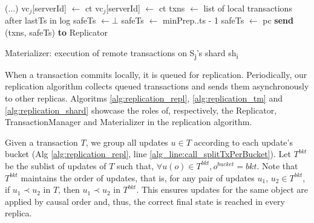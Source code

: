 \documentclass[sigplan,10pt]{acmart}
\begin{document}
\begin{algorithm}
	\small{
	\begin{algorithmic}[1]
		\Statex \hspace*{1.4em} (...)	
		\State vc$_j$[serverId] $\leftarrow$ ct
		\EndFunction
		\State vc$_j$[serverId] $\leftarrow$ ct
		\EndFunction
			\State txns $\leftarrow$ list of local transactions after lastTs in log
			\State safeTs $\leftarrow \bot$
				\State safeTs $\leftarrow $ minPrep..ts - 1 %
			\Else
				\State safeTs $\leftarrow$ pc
			\EndIf
			\State \textbf{send} (txns, safeTs) \textbf{to} Replicator
		\EndFunction
	\end{algorithmic}
}
	\caption{Materializer: execution of remote transactions on S\textsubscript{j}'s shard sh\textsubscript{i}}
	\label{alg:replication_shard}
\end{algorithm}

When a transaction commits locally, it is queued for replication.
Periodically, our replication algorithm collects queued transactions and sends them asynchronously to other replicas.
Algoritms \ref{alg:replication_repl}, \ref{alg:replication_tm} and \ref{alg:replication_shard} showcase the roles of, respectively, the Replicator, TransactionManager and Materializer in the replication algorithm.


Given a transaction $T$, we group all updates $u \in T$ according to each update's bucket (Alg \ref{alg:replication_repl}, line \ref{alg_line:call_splitTxPerBucket}).
Let $T^{bkt}$ be the sublist of updates of $T$ such that, $\forall u(o) \in T^{bkt}, o^{bucket} = bkt$.
Note that $T^{bkt}$ maintains the order of updates, that is, for any pair of updates $u_1$, $u_2 \in T^{bkt}$, if $u_1 \prec u_2$ in $T$, then $u_1 \prec u_2$ in $T^{bkt}$.
This ensures updates for the same object are applied by causal order and, thus, the correct final state is reached in every replica.
\end{document}
